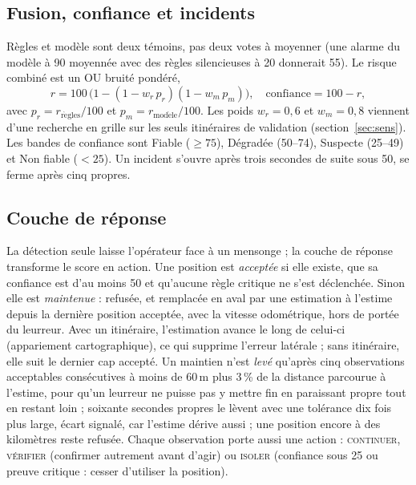 \documentclass[conference]{IEEEtran}
\begin{document}
\subsection{Fusion, confiance et incidents}
Règles et modèle sont deux témoins, pas deux votes à moyenner (une alarme du modèle à 90 moyennée avec des règles silencieuses à 20 donnerait 55). Le risque combiné est un OU bruité pondéré,
\begin{equation}
r = 100\,\bigl(1-(1-w_r\,p_r)(1-w_m\,p_m)\bigr),\quad \mathrm{confiance}=100-r,
\label{eq:fusion}
\end{equation}
avec $p_r=r_{\mathrm{r\grave{e}gles}}/100$ et $p_m=r_{\mathrm{mod\grave{e}le}}/100$. Les poids $w_r=0{,}6$ et $w_m=0{,}8$ viennent d'une recherche en grille sur les seuls itinéraires de validation (section~\ref{sec:sens}). Les bandes de confiance sont Fiable ($\ge75$), Dégradée (50--74), Suspecte (25--49) et Non fiable ($<25$). Un incident s'ouvre après trois secondes de suite sous 50, se ferme après cinq propres.

\subsection{Couche de réponse}
La détection seule laisse l'opérateur face à un mensonge ; la couche de réponse transforme le score en action. Une position est \emph{acceptée} si elle existe, que sa confiance est d'au moins 50 et qu'aucune règle critique ne s'est déclenchée. Sinon elle est \emph{maintenue} : refusée, et remplacée en aval par une estimation à l'estime depuis la dernière position acceptée, avec la vitesse odométrique, hors de portée du leurreur. Avec un itinéraire, l'estimation avance le long de celui-ci (appariement cartographique), ce qui supprime l'erreur latérale ; sans itinéraire, elle suit le dernier cap accepté. Un maintien n'est \emph{levé} qu'après cinq observations acceptables consécutives à moins de 60\,m plus 3\,\% de la distance parcourue à l'estime, pour qu'un leurreur ne puisse pas y mettre fin en paraissant propre tout en restant loin ; soixante secondes propres le lèvent avec une tolérance dix fois plus large, écart signalé, car l'estime dérive aussi ; une position encore à des kilomètres reste refusée. Chaque observation porte aussi une action : \textsc{continuer}, \textsc{vérifier} (confirmer autrement avant d'agir) ou \textsc{isoler} (confiance sous 25 ou preuve critique : cesser d'utiliser la position).
\end{document}
